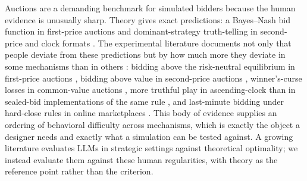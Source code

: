 \documentclass{article} %
\newif\ifmarkrev
\newcommand{\rev}[1]{\ifmarkrev\begingroup\color{red}#1\endgroup\else#1\fi}
\begin{document}
\rev{Auctions are a demanding benchmark for simulated bidders because the human evidence is unusually sharp.
Theory gives exact predictions: a Bayes--Nash bid function in first-price auctions and dominant-strategy truth-telling in second-price and clock formats \citep{myerson1981optimal, krishna2009auction}.
The experimental literature documents not only that people deviate from these predictions but by how much more they deviate in some mechanisms than in others \citep{kagel2020handbook}: bidding above the risk-neutral equilibrium in first-price auctions \citep{coppinger1980incentives, cox1988theory}, bidding above value in second-price auctions \citep{kagel1993independent}, winner's-curse losses in common-value auctions \citep{bazerman1983won, kagel1986winner, kagel1987information}, more truthful play in ascending-clock than in sealed-bid implementations of the same rule \citep{li2017obviously, breitmoser2022obviousness}, and last-minute bidding under hard-close rules in online marketplaces \citep{roth2002last, ockenfels2006late}.
This body of evidence supplies an ordering of behavioral difficulty across mechanisms, which is exactly the object a designer needs and exactly what a simulation can be tested against.
A growing literature evaluates LLMs in strategic settings against theoretical optimality; we instead evaluate them against these human regularities, with theory as the reference point rather than the criterion.}
\end{document}
